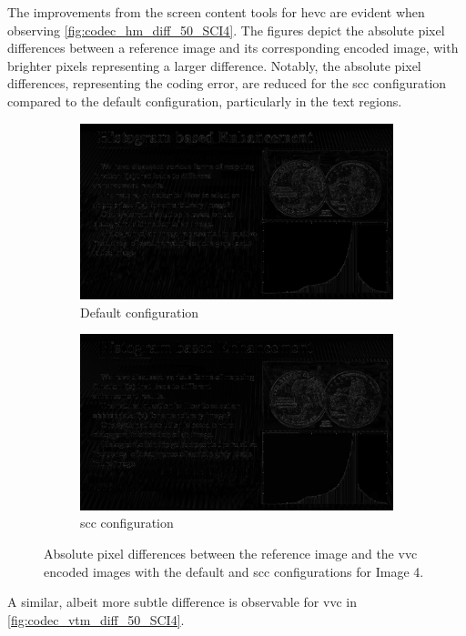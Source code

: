 The improvements from the screen content tools for \gls{hevc} are evident when observing \autoref{fig:codec_hm_diff_50_SCI4}.
The figures depict the absolute pixel differences between a reference image and its corresponding encoded image, with brighter pixels representing a larger difference.
Notably, the absolute pixel differences, representing the coding error, are reduced for the \gls{scc} configuration compared to the default configuration, particularly in the text regions.
\begin{figure}
    \centering
    \begin{subfigure}[b]{0.45\textwidth}
        \includegraphics[width=\linewidth]{../images/codec_vtm_default_diff_50_SCI4.png}
        \caption{Default configuration}
        \label{fig:codec_vtm_default_diff_50_SCI4}
    \end{subfigure}
    \hfill
    \begin{subfigure}[b]{0.45\textwidth}
        \includegraphics[width=\linewidth]{../images/codec_vtm_scc_diff_50_SCI4.png}
        \caption{\gls{scc} configuration}
        \label{fig:codec_vtm_scc_diff_50_SCI4}
    \end{subfigure}
    \caption{Absolute pixel differences between the reference image and the \gls{vvc} encoded images with the default and \gls{scc} configurations for Image 4.}
    \label{fig:codec_vtm_diff_50_SCI4}
\end{figure}
A similar, albeit more subtle difference is observable for \gls{vvc} in \autoref{fig:codec_vtm_diff_50_SCI4}.



